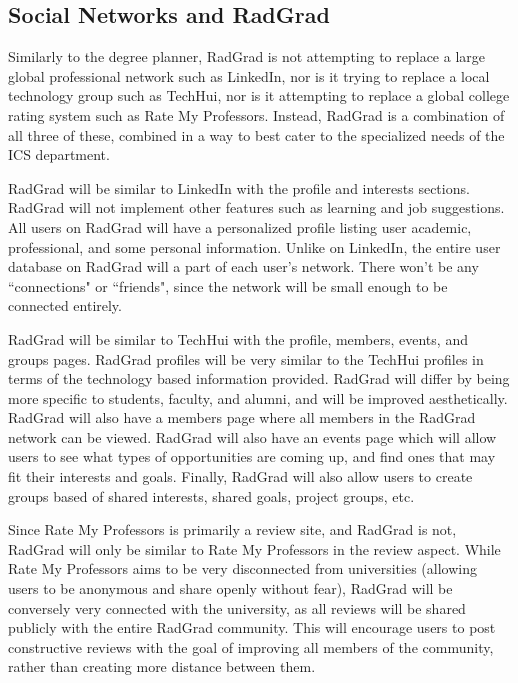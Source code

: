 \subsection{Social Networks and RadGrad}
Similarly to the degree planner, RadGrad is not attempting to replace a large global professional network such as LinkedIn, nor is it trying to replace a local technology group such as TechHui, nor is it attempting to replace a global college rating system such as Rate My Professors. Instead, RadGrad is a combination of all three of these, combined in a way to best cater to the specialized needs of the ICS department. 

RadGrad will be similar to LinkedIn with the profile and interests sections. RadGrad will not implement other features such as learning and job suggestions. All users on RadGrad will have a personalized profile listing user academic, professional, and some personal information. Unlike on LinkedIn, the entire user database on RadGrad will a part of each user's network. There won't be any ``connections" or ``friends", since the network will be small enough to be connected entirely. 

RadGrad will be similar to TechHui with the profile, members, events, and groups pages. RadGrad profiles will be very similar to the TechHui profiles in terms of the technology based information provided. RadGrad will differ by being more specific to students, faculty, and alumni, and will be improved aesthetically. RadGrad will also have a members page where all members in the RadGrad network can be viewed. RadGrad will also have an events page which will allow users to see what types of opportunities are coming up, and find ones that may fit their interests and goals. Finally, RadGrad will also allow users to create groups based of shared interests, shared goals, project groups, etc. 

Since Rate My Professors is primarily a review site, and RadGrad is not, RadGrad will only be similar to Rate My Professors in the review aspect. While Rate My Professors aims to be very disconnected from universities (allowing users to be anonymous and share openly without fear), RadGrad will be conversely very connected with the university, as all reviews will be shared publicly with the entire RadGrad community. This will encourage users to post constructive reviews with the goal of improving all members of the community, rather than creating more distance between them. 

